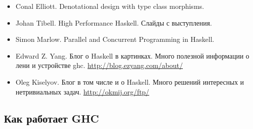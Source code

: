\begin{itemize}
\item Conal Elliott. Denotational design with type class morphisms.

\item Johan Tibell. High Performance Haskell. Слайды с выступления. 

\item Simon Marlow. Parallel and Concurrent Programming in Haskell.

\item Edward Z. Yang. Блог о Haskell в картинках. Много
    полезной информации о лени и устройстве ghc.
    \url{http://blog.ezyang.com/about/}

\item Oleg Kiselyov. Блог в том числе и о Haskell. Много решений интересных
    и нетривиальных задач. 
\url{http://okmij.org/ftp/}

\end{itemize}

\subsection{Как работает GHC}


